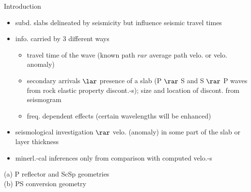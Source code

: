 \documentclass[aspectratio=169]{beamer}
\begin{document}
\begin{frame}{\SubdLithoVelo}
    Introduction
    \begin{itemize}
        \item subd. slabs delineated by seismicity but influence seismic travel times
        \item info. carried by 3 different ways
        \begin{itemize}
            \item travel time of the wave (known path $rar$ average path velo. or velo. anomaly)
            \item secondary arrivals $\lar$ presence of a slab (P $\rar$ S and S $\rar$ P waves from rock elastic property discont.-s); size and location of discont. from seismogram
            \item freq. dependent effects (certain wavelengths will be enhanced)
        \end{itemize}
        \item seismological investigation $\rar$ velo. (anomaly) in some part of the slab or layer thickness
        \item minerl.-cal inferences only from comparison with computed velo.-s
    \end{itemize}
\end{frame}


\begin{frame}{\SubdLithoVelo}
    \begin{minipage}[c]{0.45\textwidth}
    \end{minipage}
    \hspace{10pt}
    \begin{minipage}[c]{0.45\textwidth}
        (a) P reflector and ScSp geometries \\
        (b) PS conversion geometry
    \end{minipage}
\end{frame}
\end{document}
